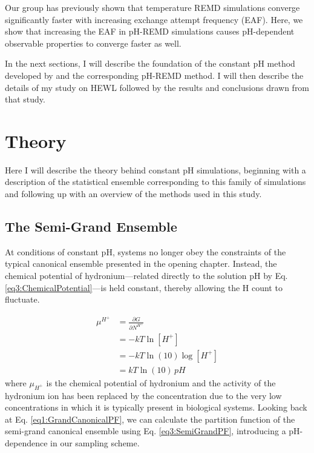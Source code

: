 Our group has previously shown that temperature REMD simulations converge
significantly faster with increasing exchange attempt frequency (EAF).
\cite{Sindhikara2008,Sindhikara2010} Here, we show that increasing the EAF in
pH-REMD simulations causes pH-dependent observable properties to converge faster
as well.

In the next sections, I will describe the foundation of the constant pH method
developed by \citeauthor{Mongan2004} \cite{Mongan2004} and the corresponding
pH-REMD method. \cite{Itoh2011,Wallace2011} I will then describe the details of
my study on HEWL followed by the results and conclusions drawn from that study.

\section{Theory}

Here I will describe the theory behind constant pH simulations, beginning with a
description of the statistical ensemble corresponding to this family of
simulations and following up with an overview of the methods used in this study.

\subsection{The Semi-Grand Ensemble}

At conditions of constant pH, systems no longer obey the constraints of the
typical canonical ensemble presented in the opening chapter. Instead, the
chemical potential of hydronium---related directly to the solution pH by Eq.
\ref{eq3:ChemicalPotential}---is held constant, thereby allowing the H\super{+}
count to fluctuate.

\begin{align}
   \mu ^ {H^+} & = \frac {\partial G} {\partial N^{H^+}} \nonumber \\
               & = -kT\ln [H^+] \nonumber \\
               & = -kT\ln (10) \log [H^+] \nonumber \\
               & = kT\ln (10)\, pH
   \label{eq3:ChemicalPotential}
\end{align}
where $\mu_{H^+}$ is the chemical potential of hydronium and the activity of the
hydronium ion has been replaced by the concentration due to the very low
concentrations in which it is typically present in biological systems. Looking
back at Eq. \ref{eq1:GrandCanonicalPF}, we can calculate the partition function
of the semi-grand canonical ensemble using Eq. \ref{eq3:SemiGrandPF},
introducing a pH-dependence in our sampling scheme.

